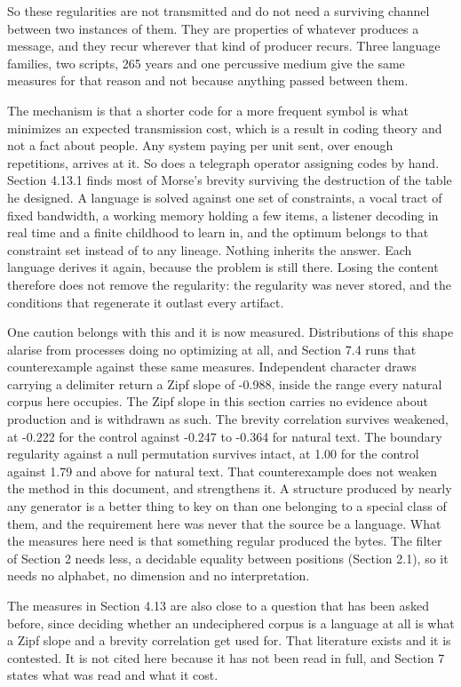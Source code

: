 So these regularities are not transmitted and do not need a surviving channel between two instances of them. They are properties of whatever produces a message, and they recur wherever that kind of producer recurs. Three language families, two scripts, 265 years and one percussive medium give the same measures for that reason and not because anything passed between them.

The mechanism is that a shorter code for a more frequent symbol is what minimizes an expected transmission cost, which is a result in coding theory and not a fact about people. Any system paying per unit sent, over enough repetitions, arrives at it. So does a telegraph operator assigning codes by hand. Section 4.13.1 finds most of Morse's brevity surviving the destruction of the table he designed. A language is solved against one set of constraints, a vocal tract of fixed bandwidth, a working memory holding a few items, a listener decoding in real time and a finite childhood to learn in, and the optimum belongs to that constraint set instead of to any lineage. Nothing inherits the answer. Each language derives it again, because the problem is still there. Losing the content therefore does not remove the regularity: the regularity was never stored, and the conditions that regenerate it outlast every artifact.

One caution belongs with this and it is now measured. Distributions of this shape alarise from processes doing no optimizing at all, and Section 7.4 runs that counterexample against these same measures. Independent character draws carrying a delimiter return a Zipf slope of -0.988, inside the range every natural corpus here occupies. The Zipf slope in this section carries no evidence about production and is withdrawn as such. The brevity correlation survives weakened, at -0.222 for the control against -0.247 to -0.364 for natural text. The boundary regularity against a null permutation survives intact, at 1.00 for the control against 1.79 and above for natural text. That counterexample does not weaken the method in this document, and strengthens it. A structure produced by nearly any generator is a better thing to key on than one belonging to a special class of them, and the requirement here was never that the source be a language. What the measures here need is that something regular produced the bytes. The filter of Section 2 needs less, a decidable equality between positions (Section 2.1), so it needs no alphabet, no dimension and no interpretation.

The measures in Section 4.13 are also close to a question that has been asked before, since deciding whether an undeciphered corpus is a language at all is what a Zipf slope and a brevity correlation get used for. That literature exists and it is contested. It is not cited here because it has not been read in full, and Section 7 states what was read and what it cost.

